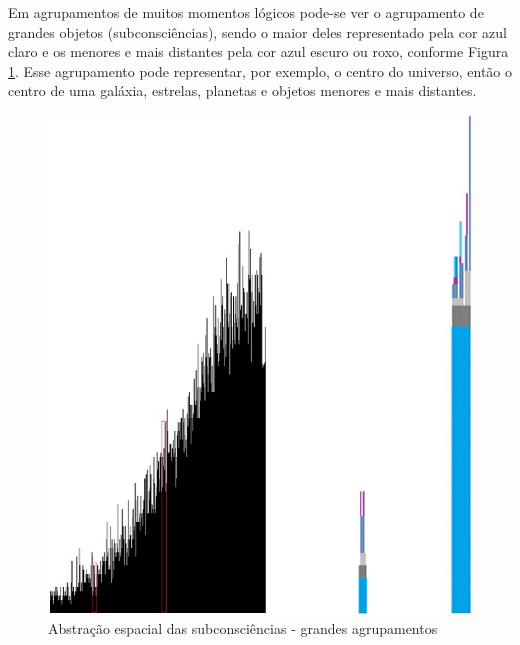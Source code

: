 Em agrupamentos de muitos momentos lógicos pode-se ver o agrupamento de grandes objetos (subconsciências), sendo o maior deles representado pela cor azul claro e os menores e mais distantes pela cor azul escuro ou roxo, conforme Figura \ref{fig:consciousness_space_subconsciousness}. Esse agrupamento pode representar, por exemplo, o centro do universo, então o centro de uma galáxia, estrelas, planetas e objetos menores e mais distantes.
\begin{figure}[H]
\caption{Abstração espacial das subconsciências - grandes agrupamentos}
\label{fig:consciousness_space_subconsciousness}
\centering
\includegraphics[scale=.5]{sections/images/consciousness_space_subconsciousness.jpg}
\end{figure}

